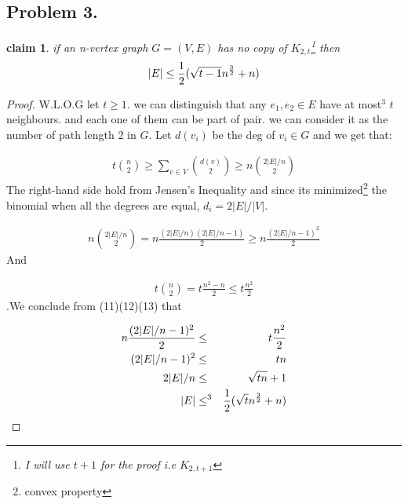\documentclass[12pt]{article}
\newtheorem*{claim*}{claim}
\begin{document}
\subsection*{Problem 3.}
\begin{claim*}
if an n-vertex graph $G = (V, E)$ has no copy of $K_{2,t}$\footnote{I will use $t+1$ for the proof i.e $K_{2,t+1}$ } then
\[|E|\le {1\over 2}(\sqrt{t-1}n^{3\over 2}+n)
\]
\end{claim*}
\begin{proof}
W.L.O.G let $t\ge 1$. we can distinguish that any $e_1,e _2\in E$ have at most$^3$ $t$ neighbours. and each one of them can be part of pair.
we can consider it as the number of path length   2 in $G$.
Let $d(v_i)$ be the deg of $v_i\in G$ and we get that:
\item \begin{eqnarray}
t\binom n2\geq \sum_{v\in V} \binom{d(v)}{2}\geq n\binom {2|E|/n}{2}
\end{eqnarray}
The right-hand side hold from  Jensen’s Inequality and  since its minimized\footnote{convex property } the binomial when all the
degrees are equal, $d_i = 2|E|/|V|.$
\item \begin{eqnarray}
n\binom {2|E|/n}{2}= n\frac{(2|E|/n)(2|E|/n-1)}{2}\ge n\frac{(2|E|/n-1)^2}{2}
\end{eqnarray}
And
\item \begin{eqnarray} t\binom n2 = t\frac{n^2-n}{2}\le t\frac{n^2}{2}
\end{eqnarray}.We conclude from (11)(12)(13) that
\item \begin{eqnarray}
n\frac{(2|E|/n-1)^2}{2} &\leq & t\frac{n^2}{2} \\
{(2|E|/n-1)^2}&\leq & tn \\
2|E|/n&\leq & \sqrt{tn}+1 \\
|E|&\leq^{3} & {1\over 2}(\sqrt{t}n^{3\over 2}+n)
\end{eqnarray}
\end{proof}
\end{document}
